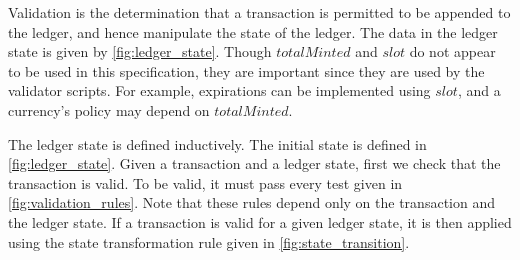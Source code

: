 \documentclass[11pt,a4paper]{article}
\newcommand{\var}[1]{\mathit{#1}}
\begin{document}
Validation is the determination that a transaction is permitted to be appended
to the ledger, and hence manipulate the state of the ledger.
The data in the ledger state is given by \cref{fig:ledger_state}.
Though $\var{totalMinted}$ and $\var{slot}$ do not appear to be used in this specification,
they are important since they are used by the validator scripts.
For example, expirations can be implemented using $\var{slot}$, and a currency's
policy may depend on $\var{totalMinted}$.

The ledger state is defined inductively.
The initial state is defined in \cref{fig:ledger_state}.
Given a transaction and a ledger state, first we check that
the transaction is valid.
To be valid, it must pass every test given in \cref{fig:validation_rules}.
Note that these rules depend only on the transaction and the ledger state.
If a transaction is valid for a given ledger state, it is then
applied using the state transformation rule given in \cref{fig:state_transition}.
\end{document}
